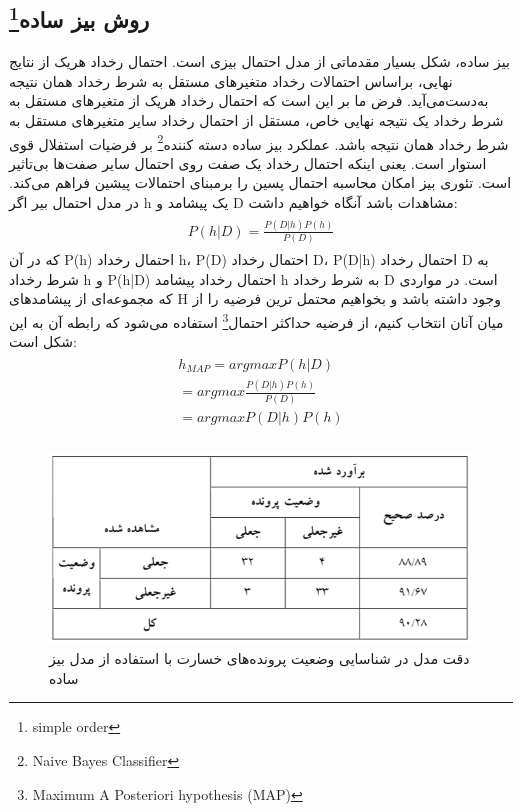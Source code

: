 \documentclass[paper=a4, fontsize=11pt]{article}
\numberwithin{equation}{section} %
\numberwithin{figure}{section} %
\numberwithin{table}{section} %
\begin{document}
\subsection{روش بیز ساده\protect\footnote{simple order}}
بیز ساده، شکل بسیار مقدماتی از مدل احتمال بیزی است. احتمال رخداد هریک از نتایج نهایی، براساس احتمالات رخداد متغیرهای مستقل به شرط رخداد همان نتیجه به‌دست‌می‌آید. فرض ما بر این است که احتمال رخداد هریک از متغیرهای مستقل به شرط رخداد یک نتیجه نهایی خاص، مستقل از احتمال رخداد سایر متغیرهای مستقل به شرط رخداد همان نتیجه باشد. عملکرد بیز ساده دسته کننده\footnote{Naive Bayes Classifier} بر فرضیات استفلال قوی استوار است. یعنی اینکه احتمال رخداد یک صفت روی احتمال سایر صفت‌ها بی‌تاثیر است. تئوری بیز امکان محاسبه احتمال پسین را برمبنای احتمالات پیشین فراهم می‌کند. در مدل احتمال بیر اگر h یک پیشامد و D مشاهدات باشد آنگاه خواهیم داشت:
\begin{align}
\begin{split}
    P(h|D) = \frac{P(D|h)P(h)}{P(D)}
\end{split}
\end{align}
که در آن P(h) احتمال رخداد h، P(D) احتمال رخداد D، P(D|h) احتمال رخداد D به شرط رخداد h و P(h|D) احتمال رخداد پیشامد h به شرط رخداد D است. در مواردی که مجموعه‌ای از پیشامدهای H وجود داشته باشد و بخواهیم محتمل ترین فرضیه را از میان آنان انتخاب کنیم، از فرضیه حداکثر احتمال\footnote{Maximum A Posteriori hypothesis (MAP)} استفاده می‌شود که رابطه آن به این شکل است:
\begin{align}
\begin{split}
    h_{MAP} = arg max P(h|D) \\
            = arg max \frac{P(D|h)P(h)}{P(D)}\\
            = arg max P(D|h)P(h)\\
\end{split}
\end{align}
\begin{figure}[h]
    \centering
    \includegraphics[scale=1]{table-b}
    \caption{دقت مدل در شناسایی وضعیت پرونده‌های خسارت با استفاده از مدل بیز ساده}
    \label{fig:table-b}
\end{figure}
\end{document}

